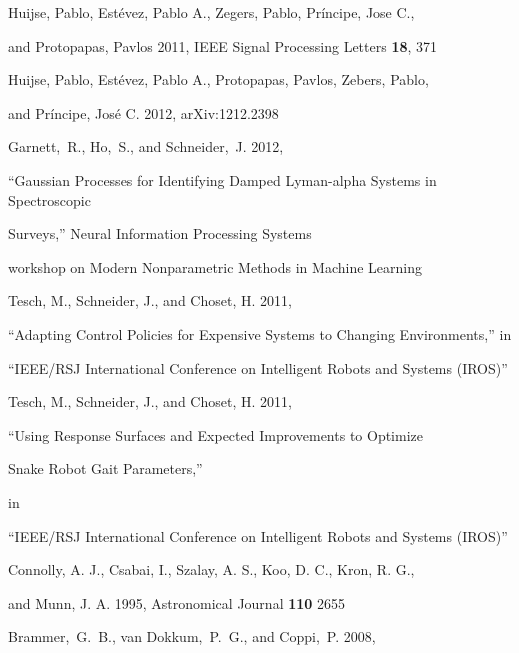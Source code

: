 \documentclass[prd,nofootbib,floatfix,11pt,tightenlines,nofootinbib]{revtex4}
\begin{document}
\begin{thebibliography}{99}

Huijse, Pablo, Est\'evez, Pablo A., Zegers, Pablo, Pr\'incipe, Jose C.,

and Protopapas, Pavlos 2011, IEEE Signal Processing Letters {\bf 18}, 371




Huijse, Pablo, Est\'evez, Pablo A., Protopapas, Pavlos, Zebers, Pablo,

and Pr\'incipe, Jos\'e C. 2012, arXiv:1212.2398




Garnett,~R., Ho,~S., and Schneider,~J. 2012,

``Gaussian Processes for Identifying Damped Lyman-alpha Systems in Spectroscopic

Surveys,'' Neural Information Processing Systems 

workshop on Modern Nonparametric Methods in Machine Learning




Tesch, M., Schneider, J., and Choset, H. 2011,

``Adapting Control Policies for Expensive Systems to Changing Environments,'' in

``IEEE/RSJ International Conference on Intelligent Robots and Systems (IROS)''




Tesch, M., Schneider, J., and Choset, H. 2011,

``Using Response Surfaces and Expected Improvements to Optimize 

Snake Robot Gait Parameters,''

in

``IEEE/RSJ International Conference on Intelligent Robots and Systems (IROS)''






Connolly, A. J., Csabai, I., Szalay, A. S., Koo, D. C., Kron, R. G.,

and Munn, J. A. 1995, Astronomical Journal {\bf 110} 2655




Brammer,~G.~B., van Dokkum,~P.~G., and Coppi,~P. 2008,


\end{thebibliography}
\end{document}
